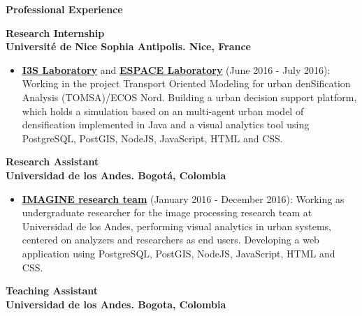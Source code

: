 \documentclass[10pt]{article}
\begin{document}
{\large \textbf{Professional Experience}}
{\footnotesize
\begin{multicols}{2}
{\bf Research Internship} \\ {\bf Université de Nice Sophia Antipolis. Nice, France}
\end{multicols}

\begin{itemize}
	\item \textcolor{blue}{\href{http://www.i3s.unice.fr/fr/presentation}{\underline{\textbf{I3S Laboratory}}}} and \textcolor{blue}{\href{http://www.umrespace.org/?lang=fr}{\underline{\textbf{ESPACE Laboratory}}}} (June 2016 - July 2016): Working in the project Transport Oriented Modeling for urban denSification Analysis (TOMSA)/ECOS Nord. Building a urban decision support platform, which holds a simulation based on an multi-agent urban model of densification implemented in Java and a visual analytics tool using PostgreSQL, PostGIS, NodeJS, JavaScript, HTML and CSS.

\end{itemize}
\begin{multicols}{2}
{\bf Research Assistant} \\ {\bf Universidad de los Andes. Bogotá, Colombia}
\end{multicols}

\begin{itemize}
	\item \textcolor{blue}{\href{http://imagine.uniandes.edu.co}{\underline{\textbf{IMAGINE research team}}}} (January 2016 - December 2016): Working as undergraduate researcher for the image processing research team at Universidad de los Andes, performing visual analytics in urban systems, centered on analyzers and researchers as end users. Developing a web application using PostgreSQL, PostGIS, NodeJS, JavaScript, HTML and CSS.
\end{itemize}

 \begin{multicols}{2}
{\bf Teaching Assistant} \\ {\bf Universidad de los Andes. Bogota, Colombia}
\end{multicols}

}
\end{document}
